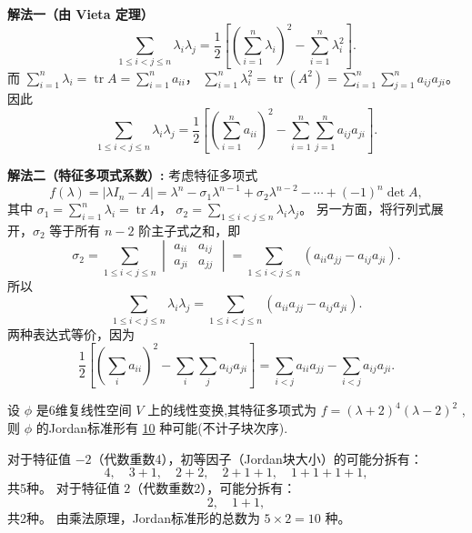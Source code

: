 \documentclass[lang=cn,12pt]{elegantbook}
\begin{document}
\begin{solution}
    \textbf{解法一（由 Vieta 定理）}
    \[
    \sum_{1\le i<j\le n}\lambda_i\lambda_j = \frac{1}{2}\left[\left(\sum_{i=1}^n\lambda_i\right)^2 - \sum_{i=1}^n\lambda_i^2\right].
    \]
    而 \(\sum_{i=1}^n\lambda_i = \operatorname{tr}A = \sum_{i=1}^n a_{ii}\)，
    \(\sum_{i=1}^n\lambda_i^2 = \operatorname{tr}(A^2) = \sum_{i=1}^n\sum_{j=1}^n a_{ij}a_{ji}\)。
    因此
    \[
    \sum_{1\le i<j\le n}\lambda_i\lambda_j = \frac{1}{2}\left[\left(\sum_{i=1}^n a_{ii}\right)^2 - \sum_{i=1}^n\sum_{j=1}^n a_{ij}a_{ji}\right].
    \]

    \textbf{解法二（特征多项式系数）:}
考虑特征多项式
\[
f(\lambda)=|\lambda I_n - A| = \lambda^n - \sigma_1\lambda^{n-1} + \sigma_2\lambda^{n-2} - \cdots + (-1)^n\det A,
\]
其中 \(\sigma_1 = \sum_{i=1}^n\lambda_i = \operatorname{tr}A\)，
\(\sigma_2 = \sum_{1\le i<j\le n}\lambda_i\lambda_j\)。
另一方面，将行列式展开，\(\sigma_2\) 等于所有 \(n-2\) 阶主子式之和，即
\[
\sigma_2 = \sum_{1\le i<j\le n}
\begin{vmatrix}
a_{ii} & a_{ij} \\
a_{ji} & a_{jj}
\end{vmatrix}
= \sum_{1\le i<j\le n} (a_{ii}a_{jj} - a_{ij}a_{ji}).
\]
所以
\[
\sum_{1\le i<j\le n}\lambda_i\lambda_j = \sum_{1\le i<j\le n} (a_{ii}a_{jj} - a_{ij}a_{ji}).
\]
两种表达式等价，因为
\[
\frac{1}{2}\left[\left(\sum_i a_{ii}\right)^2 - \sum_i\sum_j a_{ij}a_{ji}\right]
= \sum_{i<j} a_{ii}a_{jj} - \sum_{i<j} a_{ij}a_{ji}.
\]
\end{solution}

\begin{example}
    设 \(\phi\) 是6维复线性空间 \(V\) 上的线性变换,其特征多项式为 \(f = (\lambda +2)^{4}(\lambda -2)^{2}\) ,则 \(\phi\) 的Jordan标准形有 \underline{10} 种可能(不计子块次序).
\end{example}

\begin{solution}
    对于特征值 \(-2\)（代数重数4），初等因子（Jordan块大小）的可能分拆有：
    \[
    4,\quad 3+1,\quad 2+2,\quad 2+1+1,\quad 1+1+1+1,
    \]
    共5种。
    对于特征值 \(2\)（代数重数2），可能分拆有：
    \[
    2,\quad 1+1,
    \]
    共2种。
    由乘法原理，Jordan标准形的总数为 \(5\times 2 = 10\) 种。
\end{solution}
\end{document}
